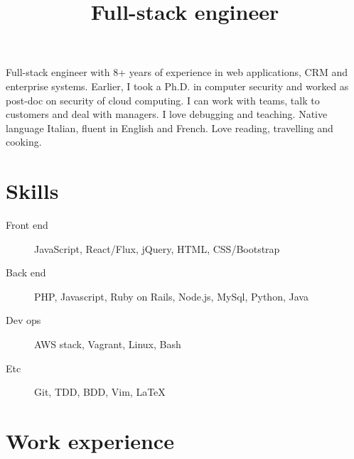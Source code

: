 \documentclass[a4paper,sans,10pt]{moderncv} %
\title{Full-stack engineer}
\newcommand{\experience}{Experience}
\newcommand{\skills}{Computer Skills}
\renewcommand{\experience}{Esperienze di lavoro}
\renewcommand{\skills}{Competenze informatiche}
\renewcommand{\experience}{Work experience}
\renewcommand{\skills}{Skills}
\begin{document}
\maketitle

	\vspace{-1.5em}  %
\justify
Full-stack engineer with 8+ years of experience in web applications, CRM and enterprise systems.
Earlier, I took a Ph.D. in computer security and worked as post-doc on security of cloud computing.
I can work with teams, talk to customers and deal with managers. I love debugging and teaching. Native language Italian, fluent in English and French. Love reading, travelling and cooking.

\section{\skills}
\begin{description}
\item [Front end] JavaScript, React/Flux, jQuery, HTML, CSS/Bootstrap
\item [Back end] PHP, Javascript, Ruby on Rails, Node.js, MySql, Python, Java
\item [Dev ops] AWS stack, Vagrant, Linux, Bash
\item [Etc] Git, TDD, BDD, Vim, LaTeX
\end{description}

  \section{\experience}
\end{document}
